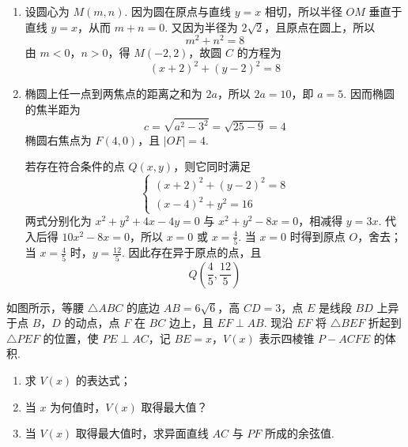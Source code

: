 \begin{solution}
\begin{enumerate}
\item 设圆心为 \(M(m,n)\). 因为圆在原点与直线 \(y=x\) 相切，所以半径 \(OM\) 垂直于直线 \(y=x\)，从而 \(m+n=0\). 又因为半径为 \(2\sqrt2\)，且原点在圆上，所以
\[
m^2+n^2=8
\]
由 \(m<0\)，\(n>0\)，得 \(M(-2,2)\)，故圆 \(C\) 的方程为
\[
(x+2)^2+(y-2)^2=8
\]

\item 椭圆上任一点到两焦点的距离之和为 \(2a\)，所以 \(2a=10\)，即 \(a=5\). 因而椭圆的焦半距为
\[
c=\sqrt{a^2-3^2}=\sqrt{25-9}=4
\]
椭圆右焦点为 \(F(4,0)\)，且 \(|OF|=4\).

若存在符合条件的点 \(Q(x,y)\)，则它同时满足
\[
\begin{cases}
(x+2)^2+(y-2)^2=8\\
(x-4)^2+y^2=16
\end{cases}
\]
两式分别化为 \(x^2+y^2+4x-4y=0\) 与 \(x^2+y^2-8x=0\)，相减得 \(y=3x\). 代入后得 \(10x^2-8x=0\)，所以 \(x=0\) 或 \(x=\frac45\).
当 \(x=0\) 时得到原点 \(O\)，舍去；当 \(x=\frac45\) 时，\(y=\frac{12}{5}\). 因此存在异于原点的点，且
\[
Q\left(\frac45,\frac{12}{5}\right)
\]
\end{enumerate}
\end{solution}

\begin{problem}
如图所示，等腰 \(\triangle ABC\) 的底边 \(AB = 6\sqrt{6}\)，高 \(CD = 3\)，点 \(E\) 是线段 \(BD\) 上异于点 \(B\)，\(D\) 的动点，点 \(F\) 在 \(BC\) 边上，且 \(EF \perp AB\). 现沿 \(EF\) 将 \(\triangle BEF\) 折起到 \(\triangle PEF\) 的位置，使 \(PE \perp AC\)，记 \(BE = x\)，\(V(x)\) 表示四棱锥 \(P - ACFE\) 的体积.

\begin{enumerate}
\item 求 \(V(x)\) 的表达式；
\item 当 \(x\) 为何值时，\(V(x)\) 取得最大值？
\item 当 \(V(x)\) 取得最大值时，求异面直线 \(AC\) 与 \(PF\) 所成的余弦值.
\end{enumerate}

\end{problem}

